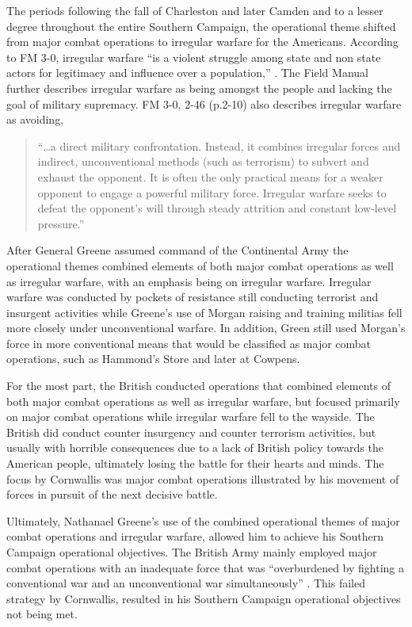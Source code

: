 The periods following the fall of Charleston and later Camden and to a lesser
degree throughout the entire Southern Campaign, the operational theme shifted
from major combat operations to irregular warfare for the Americans.  According
to FM 3-0, irregular warfare “is a violent struggle among state and non state
actors for legitimacy and influence over a population,” \cite[\S 2-45, pp.
2-10]{fm3-0}.  The Field Manual further describes irregular warfare as being
amongst the people and lacking the goal of military supremacy.  FM 3-0, 2-46
(p.2-10) also describes irregular warfare as avoiding, 

\begin{quote}
“…a direct military confrontation. Instead, it combines irregular forces and
indirect, unconventional methods (such as terrorism) to subvert and exhaust the
opponent. It is often the only practical means for a weaker opponent to engage a
powerful military force. Irregular warfare seeks to defeat the opponent’s will
through steady attrition and constant low-level pressure.”
\end{quote}

After General Greene assumed command of the Continental Army the operational
themes combined elements of both major combat operations as well as irregular
warfare, with an emphasis being on irregular warfare.  Irregular warfare was
conducted by pockets of resistance still conducting terrorist and insurgent
activities while Greene’s use of Morgan raising and training militias fell more
closely under unconventional warfare.  In addition, Green still used Morgan’s
force in more conventional means that would be classified as major combat
operations, such as Hammond’s Store and later at Cowpens.

For the most part, the British conducted operations that combined elements of
both major combat operations as well as irregular warfare, but focused primarily
on major combat operations while irregular warfare fell to the wayside.  The
British did conduct counter insurgency and counter terrorism activities, but
usually with horrible consequences due to a lack of British policy towards the
American people, ultimately losing the battle for their hearts and minds.  The
focus by Cornwallis was major combat operations illustrated by his movement of
forces in pursuit of the next decisive battle.  

Ultimately, Nathanael Greene’s use of the combined operational themes of major
combat operations and irregular warfare, allowed him to achieve his Southern
Campaign operational objectives.  The British Army mainly employed major combat
operations with an inadequate force that was “overburdened by fighting a
conventional war and an unconventional war simultaneously” \cite[55]{woodward_comparative_2002}. 
This failed strategy by Cornwallis, resulted in his Southern Campaign
operational objectives not being met.

